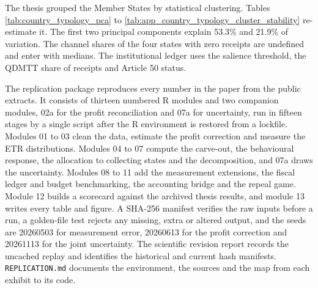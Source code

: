 \documentclass[11pt,a4paper]{article}
\begin{document}


The thesis grouped the Member States by statistical clustering. Tables \ref{tab:country_typology_pca} to \ref{tab:app_country_typology_cluster_stability} re-estimate it. The first two principal components explain 53.3\% and 21.9\% of variation. The channel shares of the four states with zero receipts are undefined and enter with medians. The institutional ledger uses the salience threshold, the QDMTT share of receipts and Article 50 status.






The replication package reproduces every number in the paper from the public extracts. It consists of thirteen numbered R modules and two companion modules, 02a for the profit reconciliation and 07a for uncertainty, run in fifteen stages by a single script after the R environment is restored from a lockfile. Modules 01 to 03 clean the data, estimate the profit correction and measure the ETR distributions. Modules 04 to 07 compute the carve-out, the behavioural response, the allocation to collecting states and the decomposition, and 07a draws the uncertainty. Modules 08 to 11 add the measurement extensions, the fiscal ledger and budget benchmarking, the accounting bridge and the repeal game. Module 12 builds a scorecard against the archived thesis results, and module 13 writes every table and figure. A SHA-256 manifest verifies the raw inputs before a run, a golden-file test rejects any missing, extra or altered output, and the seeds are 20260503 for measurement error, 20260613 for the profit correction and 20261113 for the joint uncertainty. The scientific revision report records the uncached replay and identifies the historical and current hash manifests. \texttt{REPLICATION.md} documents the environment, the sources and the map from each exhibit to its code.
\end{document}
